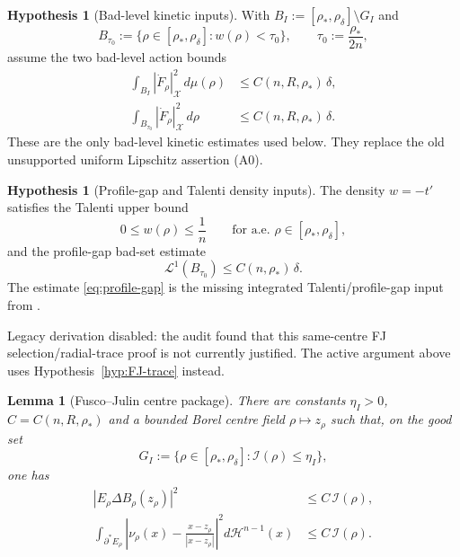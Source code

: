\documentclass[11pt]{article}
\newtheorem{lemma}[theorem]{Lemma}
\theoremstyle{definition}
\newtheorem{hypothesis}[theorem]{Hypothesis}
\newcommand{\rstar}{\rho_{*}}
\newcommand{\X}{\mathcal X}
\begin{document}
\begin{hypothesis}[Bad-level kinetic inputs]\label{hyp:bad-kinetic}
With $B_I:=[\rstar,\rho_\delta]\setminus G_I$ and
\[
   B_{\tau_0}:=\{\rho\in[\rstar,\rho_\delta]:w(\rho)<\tau_0\},
   \qquad \tau_0:=\frac{\rstar}{2n},
\]
assume the two bad-level action bounds
\begin{align}
   \int_{B_I}|\dot F_\rho|_\X^2\,d\mu(\rho)
      &\le C(n,R,\rstar)\,\delta,\label{eq:bad-I-action}\\
   \int_{B_{\tau_0}}|\dot F_\rho|_\X^2\,d\rho
      &\le C(n,R,\rstar)\,\delta.\label{eq:bad-tau-action}
\end{align}
These are the only bad-level kinetic estimates used below.  They replace
the old unsupported uniform Lipschitz assertion (A0).
\end{hypothesis}

\begin{hypothesis}[Profile-gap and Talenti density inputs]\label{hyp:profile-gap}
The density $w=-t'$ satisfies the Talenti upper bound
\[
   0\le w(\rho)\le \frac1n\qquad\text{for a.e. }\rho\in[\rstar,\rho_\delta],
\]
and the profile-gap bad-set estimate
\begin{equation}\label{eq:profile-gap}
   \mathcal L^1(B_{\tau_0})\le C(n,\rstar)\,\delta.
\end{equation}
The estimate \eqref{eq:profile-gap} is the missing integrated
Talenti/profile-gap input from \cite{LevelSetIdentity}.
\end{hypothesis}

\iffalse
Legacy derivation disabled: the audit found that this same-centre FJ
selection/radial-trace proof is not currently justified.  The active
argument above uses Hypothesis~\ref{hyp:FJ-trace} instead.

\begin{lemma}[Fusco--Julin centre package]\label{lem:FJ-package}
There are constants $\eta_I>0$, $C=C(n,R,\rstar)$ and a bounded Borel centre
field $\rho\mapsto z_\rho$ such that, on the good set
\[
   G_I:=\{\rho\in[\rstar,\rho_\delta]:\mathcal I(\rho)\le\eta_I\},
\]
one has
\begin{align}
   |E_\rho\Delta B_\rho(z_\rho)|^2
      &\le C\,\mathcal I(\rho),\label{eq:FJ-asym}\\
   \int_{\partial^*E_\rho}
      \left|\nu_\rho(x)-\frac{x-z_\rho}{|x-z_\rho|}\right|^2
      d\mathcal H^{n-1}(x)
      &\le C\,\mathcal I(\rho).\label{eq:FJ-normal}
\end{align}
\end{lemma}
\end{document}
